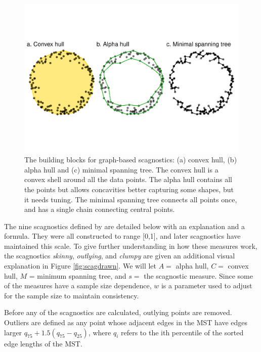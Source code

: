 \begin{Schunk}
\begin{figure}
\includegraphics[width=1\linewidth]{mason-lee-laa-cook_files/figure-latex/building-blocks2-1} \caption[The building blocks for graph-based scagnostics]{The building blocks for graph-based scagnostics: (a) convex hull, (b) alpha hull and (c) minimal spanning tree. The convex hull is a convex shell around all the data points. The alpha hull contains all the points but allows concavities better capturing some shapes, but it needs tuning. The minimal spanning tree connects all points once, and has a single chain connecting central points.}\label{fig:building-blocks2}
\end{figure}
\end{Schunk}

The nine scagnostics defined by \citet{scagdist} are detailed below with
an explanation and a formula. They were all constructed to range
{[}0,1{]}, and later scagnostics have maintained this scale. To give
further understanding in how these measures work, the scagnostics
\emph{skinny}, \emph{outlying}, and \emph{clumpy} are given an
additional visual explanation in Figure \ref{fig:scagdrawn}. We will let
\(A=\) alpha hull, \(C=\) convex hull, \(M\) = minimum spanning tree,
and \(s=\) the scagnostic measure. Since some of the measures have a
sample size dependence, \(w\) is a parameter used to adjust for the
sample size to maintain consistency.

Before any of the scagnostics are calculated, outlying points are
removed. Outliers are defined as any point whose adjacent edges in the
MST have edges larger \(q_{75} + 1.5(q_{75} - q_{25})\), where \(q_i\)
refers to the ith percentile of the sorted edge lengths of the MST.


